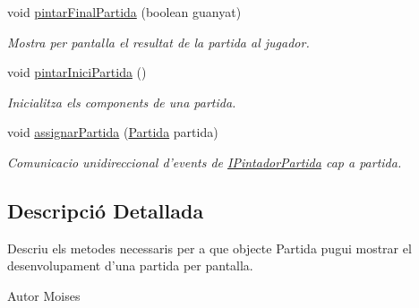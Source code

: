 \begin{DoxyCompactItemize}
void \hyperlink{interfaceinterficie_1_1_i_pintador_partida_ab1897fb15335043e4d9be27e578e1338}{pintar\+Final\+Partida} (boolean guanyat)
\begin{DoxyCompactList}\small\item\em Mostra per pantalla el resultat de la partida al jugador. \end{DoxyCompactList}\item 
\hypertarget{interfaceinterficie_1_1_i_pintador_partida_a9ef27828b69d1e7c3409a1f5d9504026}{void \hyperlink{interfaceinterficie_1_1_i_pintador_partida_a9ef27828b69d1e7c3409a1f5d9504026}{pintar\+Inici\+Partida} ()}\label{interfaceinterficie_1_1_i_pintador_partida_a9ef27828b69d1e7c3409a1f5d9504026}

\begin{DoxyCompactList}\small\item\em Inicialitza els components de una partida. \end{DoxyCompactList}\item 
\hypertarget{interfaceinterficie_1_1_i_pintador_partida_aefc777b7be8ea147041d9da7c45044cc}{void \hyperlink{interfaceinterficie_1_1_i_pintador_partida_aefc777b7be8ea147041d9da7c45044cc}{assignar\+Partida} (\hyperlink{classlogica_1_1_partida}{Partida} partida)}\label{interfaceinterficie_1_1_i_pintador_partida_aefc777b7be8ea147041d9da7c45044cc}

\begin{DoxyCompactList}\small\item\em Comunicacio unidireccional d'events de \hyperlink{interfaceinterficie_1_1_i_pintador_partida}{I\+Pintador\+Partida} cap a partida. \end{DoxyCompactList}\end{DoxyCompactItemize}


\subsection{Descripció Detallada}
Descriu els metodes necessaris per a que objecte Partida pugui mostrar el desenvolupament d'una partida per pantalla. 

\begin{DoxyAuthor}{Autor}
Moises 
\end{DoxyAuthor}


